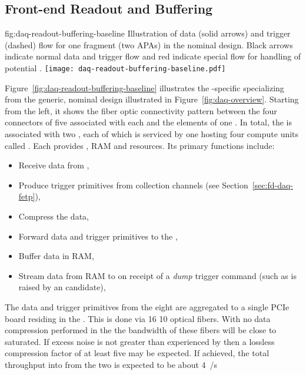 

\subsection{Front-end Readout and Buffering}
\label{sec:fd-daq-fero}


\begin{dunefigure}{fig:daq-readout-buffering-baseline}
  {Illustration of data (solid arrows) and trigger (dashed) flow for
    one \single {} fragment (two APAs) in the nominal design. 
    Black arrows indicate normal data and trigger flow and red indicate special flow
    for handling of potential .  } %
  \texttt{[image: daq-readout-buffering-baseline.pdf]}%
\end{dunefigure}


Figure~\ref{fig:daq-readout-buffering-baseline} illustrates the
-specific  specializing from the generic,
nominal design illustrated in Figure~\ref{fig:daq-overview}.  
Starting from the left, it shows the fiber optic connectivity pattern
between the four connectors of five   associated
with each  and the elements of one  . 
In total, the  is associated with two , each of which
is serviced by one   hosting four compute
units called . 
Each  provides , RAM and  resources.
Its primary functions include:
\begin{itemize}
\item Receive data from ,
\item Produce trigger primitives from collection channels (see Section~\ref{sec:fd-daq-fetp}),
\item Compress the data,
\item Forward data and trigger primitives to the ,
\item Buffer data in RAM, 
\item Stream data from RAM to  on receipt of a \textit{dump}
  trigger command (such as is raised by an  candidate),
\end{itemize}

The data and trigger primitives from the eight  are
aggregated to a single  PCIe board residing in the
. 
This is done via \num{16} \SI{10}{\Gbps} optical fibers. 
With no data compression performed in the  the bandwidth
of these fibers will be close to saturated. 
If excess noise is not greater than experienced by \microboone then a
lossless compression factor of at least five may be expected.
If achieved, the total throughput into  from the two 
is expected to be about \SI{4}{\GB/s}

